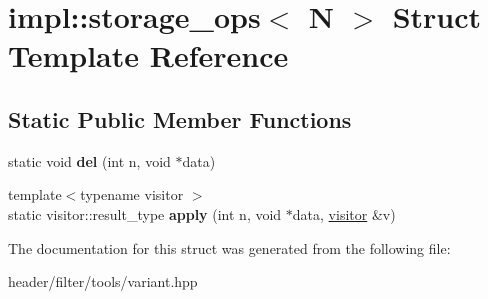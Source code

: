 \hypertarget{structimpl_1_1storage__ops_3_01_n_01_4}{}\section{impl\+:\+:storage\+\_\+ops$<$ N $>$ Struct Template Reference}
\label{structimpl_1_1storage__ops_3_01_n_01_4}
\subsection*{Static Public Member Functions}
\begin{DoxyCompactItemize}
\item 
\mbox{\label{structimpl_1_1storage__ops_3_01_n_01_4_a2dc2335a2e357d4b8d895459686ef5a7}} 
static void {\bfseries del} (int n, void $\ast$data)
\item 
\mbox{\label{structimpl_1_1storage__ops_3_01_n_01_4_a43f70873e6140cd6255b77291b71d7f8}} 
{\footnotesize template$<$typename visitor $>$ }\\static visitor\+::result\+\_\+type {\bfseries apply} (int n, void $\ast$data, \hyperlink{structvisitor}{visitor} \&v)
\end{DoxyCompactItemize}


The documentation for this struct was generated from the following file\+:\begin{DoxyCompactItemize}
\item 
header/filter/tools/variant.\+hpp\end{DoxyCompactItemize}
